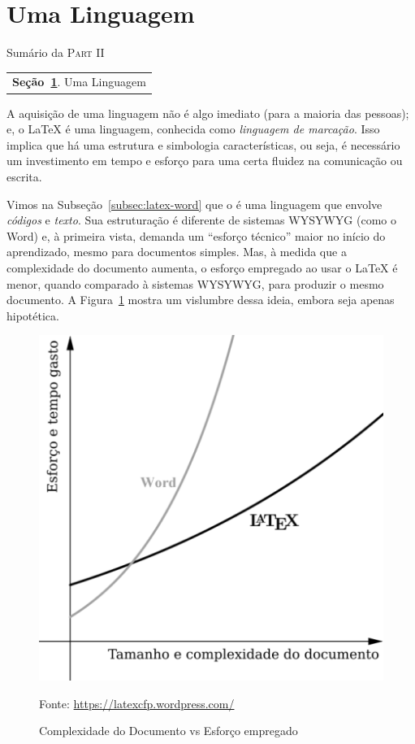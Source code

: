 \section{Uma Linguagem} %
\label{sec:aprendendo}

\begin{margintable}\vspace{.8in}\footnotesize
  \caption{Sumário da \textsc{Part II}}
  \medskip
  \begin{tabularx}{\marginparwidth}{|X}
    \textbf{\sffamily \textcolor{azulUFRB}{Seção}~\ref{sec:aprendendo}}.    {\sffamily Uma Linguagem} \\
  \end{tabularx}
\end{margintable}

A aquisição de uma linguagem não é algo imediato (para a maioria das pessoas); e,
o \LaTeX{} é uma linguagem, conhecida como \textit{linguagem de marcação}.
Isso implica que há uma \textsf{estrutura} e \textsf{simbologia} características, 
ou seja, é necessário um investimento em tempo e esforço para uma certa fluidez 
na comunicação ou escrita.

Vimos na Subseção~\ref{subsec:latex-word} que o  é uma linguagem 
que envolve \textit{códigos} e \textit{texto}.
Sua estruturação é diferente de sistemas \textsf{WYSYWYG} (como o Word) e, à
primeira vista, demanda um ``esforço técnico'' maior no início do aprendizado, 
mesmo para documentos simples.
Mas, à medida que a complexidade do documento aumenta, o esforço empregado ao 
usar o \LaTeX{} é menor, quando comparado à sistemas \textsf{WYSYWYG}, para 
produzir o mesmo documento.
A Figura~\ref{fig:latex-vs-word} mostra um vislumbre dessa ideia, embora seja
apenas hipotética.

\begin{figure}[!htbp]
  \centering
  \caption{Complexidade do Documento vs Esforço empregado}
  \label{fig:latex-vs-word}
  \medskip
  \includegraphics[width = 0.6\linewidth]{figs/latex-vs-word.png}
  
  {\small \textsf{Fonte:} \url{https://latexcfp.wordpress.com/}}
\end{figure}

